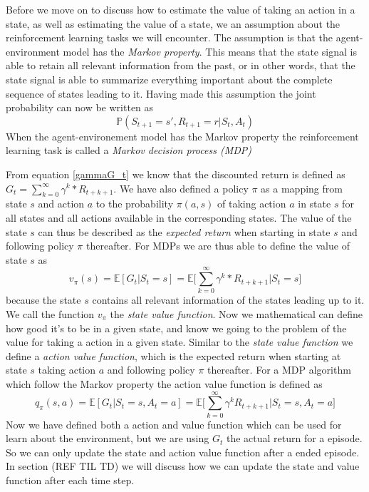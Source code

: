 \documentclass[11pt]{article}
\begin{document}
Before we move on to discuss how to estimate the value of taking an action in a state, as
well as estimating the value of a state, we an assumption about the reinforcement
learning tasks we will encounter.
The assumption is that the agent-environment model has the \textit{Markov property}.
This means that the state signal is able to retain all relevant information
from the past, or in other words, that the state signal is able to summarize
everything important about the complete sequence of states leading to it.
Having made this assumption the joint probability can now be written as
\begin{equation}
    \mathds{P}(S_{t+1} = s', R_{t+1} = r | S_t, A_t)
\end{equation}
When the agent-environement model has the Markov property the reinforcement
learning task is called a \textit{Markov decision process (MDP)}

From equation \ref{gammaG_t} we know that the discounted return
is defined as $G_t = \sum\limits_{k=0}^\infty \gamma^k * R_{t+k+1}$.
We have also defined a policy $\pi$ as a mapping from state $s$ and action $a$
to the probability $\pi(a, s)$ of taking action $a$ in state $s$ for all states
and all actions available in the corresponding states.
The value of the state $s$ can thus be described as the \textit{expected return}
when starting in state $s$ and following policy $\pi$ thereafter\cite{RLBook}.
For MDPs we are thus able to define the value of state $s$ as
\begin{equation}
    v_\pi(s) = \mathds{E}[G_t | S_t = s] = \mathds{E}\big[\sum\limits_{k=0}^\infty \gamma^k * R_{t+k+1} \big| S_t = s\big]
\end{equation}
because the state $s$ contains all relevant information of the states leading up to it. We call the function $v_{\pi}$ the \textit{state value function}. Now we mathematical can define how good it's to be in a given state, and know we going to the problem of the value for taking a action in a given state. Similar to the \textit{state value function} we define a \textit{action value function}, which is the expected return when starting at state $s$ taking action $a$ and following policy $\pi$ thereafter. For a MDP algorithm which follow the Markov property the action value function is defined as
\begin{equation}
    q_{\pi}(s, a) = \mathds{E}[G_{t} | S_{t} = s, A_{t} = a] = \mathds{E}\bigg[\sum_{k = 0}^{\infty} \gamma^{k} R_{t + k + 1} \bigg| S_{t} = s, A_{t} = a \bigg]
\end{equation}
Now we have defined both a action and value function which can be used for learn about the environment, but we are using $G_{t}$ the actual return for a episode. So we can only update the state and action value function after a ended episode. In section (REF TIL TD) we will discuss how we can update the state and value function after each time step.
\end{document}
